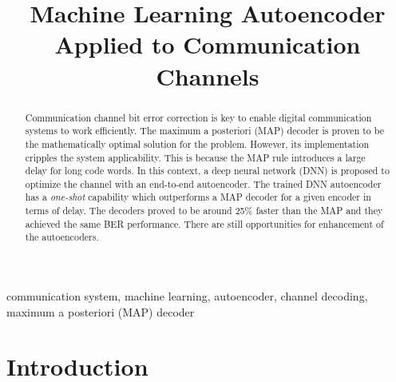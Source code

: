 \documentclass[conference]{IEEEtran}
\begin{document}
\title{Machine Learning Autoencoder Applied to Communication Channels}


\author{


}


\maketitle

\begin{abstract}

Communication channel bit error correction is key to enable digital  communication systems to work efficiently. The maximum a posteriori (MAP) decoder is proven to be the mathematically optimal solution for the problem. However, its implementation cripples the system applicability. This is because the MAP rule introduces a large delay for long code words. In this context, a deep neural network (DNN) is proposed to optimize the channel with an end-to-end autoencoder. The trained DNN autoencoder has a \textit{one-shot} capability which outperforms a MAP decoder for a given encoder in terms of delay. The decoders proved to be around 25\% faster than the MAP and they achieved the same BER performance. There are still opportunities for enhancement of the autoencoders.

\end{abstract}

\begin{IEEEkeywords}
communication system, machine learning,  autoencoder, channel decoding, maximum a posteriori (MAP) decoder 
\end{IEEEkeywords}

\section{Introduction}
\end{document}
